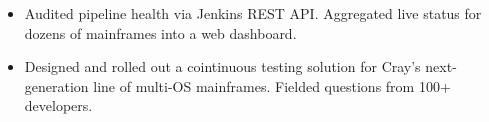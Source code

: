 \documentclass[12pt,letterpaper]{article}
\newcommand{\CPP}{C\nolinebreak[4]\hspace{-.05em}\raisebox{.22ex}{\footnotesize\bf ++}\xspace}
\begin{document}
\begin{itemize}[leftmargin=\parindent]
\begin{itemize}[leftmargin=\parindent]
            \item Audited pipeline health via Jenkins REST API. Aggregated live status for dozens of mainframes into a web dashboard.

            \item Designed and rolled out a cointinuous testing solution for Cray's next-generation line of multi-OS mainframes. Fielded questions from 100+ developers.







\end{itemize}
\end{itemize}
\end{document}
